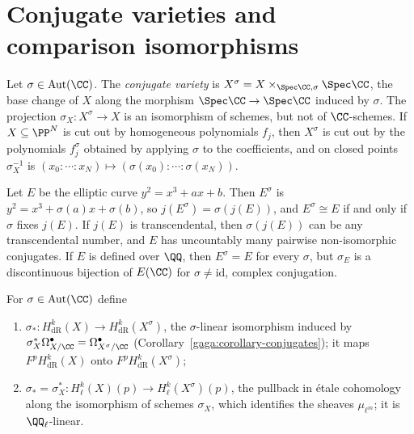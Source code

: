 \section{Conjugate varieties and comparison isomorphisms}\label{absolute-hodge:section-conjugates}

\begin{definition}\label{absolute-hodge:definition-conjugate}
Let $\sigma \in \mathrm{Aut}(\CC)$. The \emph{conjugate variety} is $X^\sigma = X \times_{\Spec\CC,\sigma}\Spec\CC$, the base change of $X$ along the morphism $\Spec\CC \to \Spec\CC$ induced by $\sigma$. The
projection $\sigma_X \colon X^\sigma \to X$ is an isomorphism of schemes, but not of $\CC$-schemes. If $X \subseteq \PP^N$ is cut out by homogeneous polynomials $f_j$, then $X^\sigma$ is cut out by the
polynomials $f_j^\sigma$ obtained by applying $\sigma$ to the coefficients, and on closed points $\sigma_X^{-1}$ is $(x_0 : \cdots : x_N) \mapsto (\sigma(x_0) : \cdots : \sigma(x_N))$.
\end{definition}

\begin{example}\label{absolute-hodge:example-elliptic}
Let $E$ be the elliptic curve $y^2 = x^3 + ax + b$. Then $E^\sigma$ is $y^2 = x^3 + \sigma(a)x + \sigma(b)$, so $j(E^\sigma) = \sigma(j(E))$, and $E^\sigma \cong E$ if and only if $\sigma$ fixes $j(E)$. If
$j(E)$ is transcendental, then $\sigma(j(E))$ can be any transcendental number, and $E$ has uncountably many pairwise non-isomorphic conjugates. If $E$ is defined over $\QQ$, then $E^\sigma = E$ for
every $\sigma$, but $\sigma_E$ is a discontinuous bijection of $E(\CC)$ for $\sigma \neq \mathrm{id}$, complex conjugation.
\end{example}

\begin{definition}\label{absolute-hodge:definition-transport}
For $\sigma \in \mathrm{Aut}(\CC)$ define
\begin{enumerate}
\item $\sigma_* \colon H^k_{\mathrm{dR}}(X) \to H^k_{\mathrm{dR}}(X^\sigma)$, the $\sigma$-linear isomorphism induced by $\sigma_X^*\Omega^\bullet_{X/\CC} = \Omega^\bullet_{X^\sigma/\CC}$
(Corollary~\ref{gaga:corollary-conjugates}); it maps $F^pH^k_{\mathrm{dR}}(X)$ onto $F^pH^k_{\mathrm{dR}}(X^\sigma)$;
\item $\sigma_* = \sigma_X^* \colon H^k_\ell(X)(p) \to H^k_\ell(X^\sigma)(p)$, the pullback in \'etale cohomology along the isomorphism of schemes $\sigma_X$, which identifies the sheaves $\mu_{\ell^m}$; it is
$\QQ_\ell$-linear.
\end{enumerate}
\end{definition}

